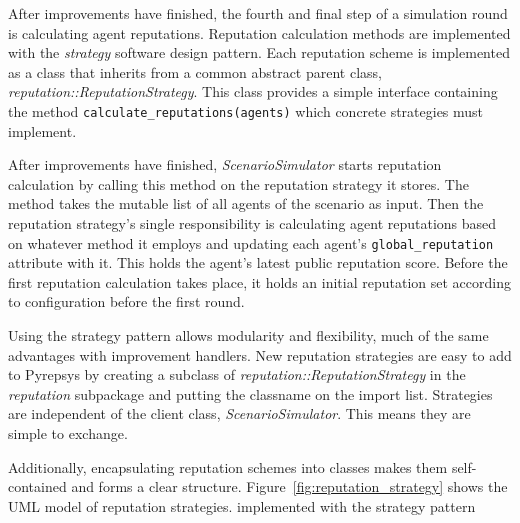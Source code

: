 \documentclass[%
    ]{\PathToTumTemplate/thesis/tum_thesis}
\begin{document}
After improvements have finished, the fourth and final step of a simulation round is calculating agent reputations.
Reputation calculation methods are implemented with the \emph{strategy} software design pattern.
Each reputation scheme is implemented as a class that inherits from a common abstract parent class, \emph{reputation::ReputationStrategy}.
This class provides a simple interface containing the method \texttt{calculate\_reputations(agents)} which concrete strategies must implement.

After improvements have finished, \emph{ScenarioSimulator} starts reputation calculation by calling this method on the reputation strategy it stores.
The method takes the mutable list of all agents of the scenario as input.
Then the reputation strategy's single responsibility is calculating agent reputations based on whatever method it employs and updating each agent's \texttt{global\_reputation} attribute with it.
This holds the agent's latest public reputation score.
Before the first reputation calculation takes place, it holds an initial reputation set according to configuration before the first round.

Using the strategy pattern allows modularity and flexibility, much of the same advantages with improvement handlers.
New reputation strategies are easy to add to Pyrepsys by creating a subclass of \emph{reputation::ReputationStrategy} in the \emph{reputation} subpackage and putting the classname on the import list.
Strategies are independent of the client class, \emph{ScenarioSimulator}.
This means they are simple to exchange.

Additionally, encapsulating reputation schemes into classes makes them self-contained and forms a clear structure.
Figure~\ref{fig:reputation_strategy} shows the UML model of reputation strategies.
implemented with the strategy pattern
\end{document}
